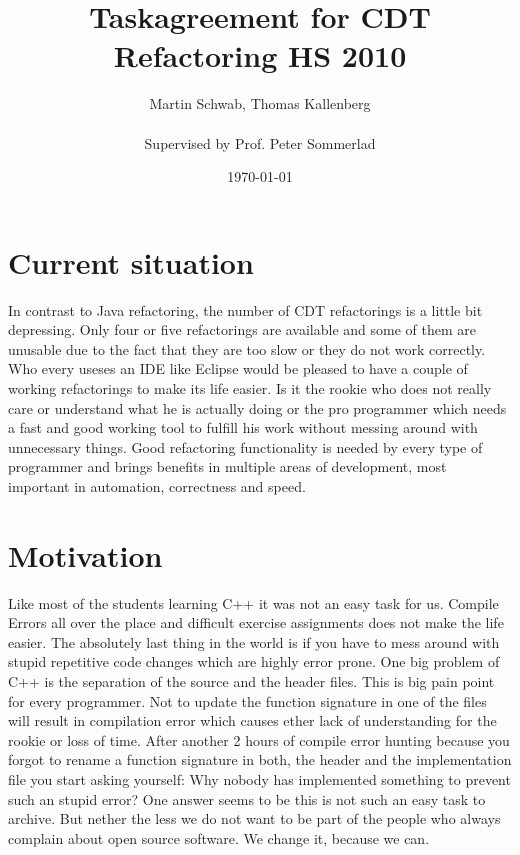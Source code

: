 \documentclass[a4paper,10pt]{scrreprt}
\title{Taskagreement for CDT Refactoring HS 2010}
\author{Martin Schwab, Thomas Kallenberg\\ \\Supervised by Prof. Peter Sommerlad}
\date{\today}
\begin{document}
\maketitle

\section{Current situation}

In contrast to Java refactoring, the number of CDT refactorings is a little bit depressing. Only four or five refactorings are available and some of them are unusable due to the fact that they are too slow or they do not work correctly.\newline
Who every useses an IDE like Eclipse would be pleased to have a couple of working refactorings to make its life easier. Is it the rookie who does not really care or understand what he is actually doing or the pro programmer which needs a fast and good working tool to fulfill his work without messing around with unnecessary things. Good refactoring functionality is needed by every type of programmer and brings benefits in multiple areas of development, most important in automation, correctness and speed.

\section{Motivation}

Like most of the students learning C++ it was not an easy task for us. Compile Errors all over the place and difficult exercise assignments does not make the life easier. The absolutely last thing in the world is if you have to mess around with stupid repetitive code changes which are highly error prone.\newline\newline
One big problem of C++ is the separation of the source and the header files. This is big pain point for every programmer. Not to update the function signature in one of the files will result in compilation error which causes ether lack of understanding for the rookie or loss of time.\newline
After another 2 hours of compile error hunting because you forgot to rename a function signature in both, the header and the implementation file you start asking yourself: Why nobody has implemented something to prevent such an stupid error?\newline
One answer seems to be this is not such an easy task to archive. But nether the less we do not want to be part of the people who always complain about open source software. We change it, because we can.
\end{document}
